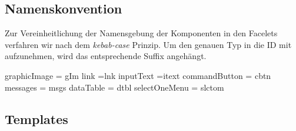 \newcommand{\ftable}[1]{\begin{sidewaystable}
\begin{tabular}[H]{ |m{2cm}| m{3cm}| m{4cm}| m{6cm} |m{4cm}| m{2cm}| }
    \toprule
    \textbf{ID} & \textbf{Typ} & \textbf{Beschreibung} & \textbf{Binding} & \textbf{Constraints} & \textbf{Validator \newline Converter} \\
    \midrule
    #1
\end{tabular}
\end{sidewaystable}
}

\newcommand{\fentry}[6]{#1 & #2 & #3 & #4 & #5 & #6\\\hline}


\subsection{Namenskonvention}

Zur Vereinheitlichung der Namensgebung der Komponenten in den Facelets verfahren wir nach dem \emph{kebab-case} Prinzip. Um den genauen Typ in die ID mit aufzunehmen, wird das entsprechende Suffix angehängt.

 graphicImage = gIm link =lnk inputText =itext commandButton = cbtn messages = msgs dataTable = dtbl selectOneMenu = slctom

\subsection{Templates}

